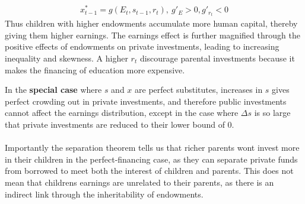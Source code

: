 \documentclass[12pt, a4paper]{article}
\begin{document}
\begin{multicols}{2}
\begin{align*}
x_{t-1}^* = g(E_t, s_{t-1},r_t), \ g'_E>0, g'_{r_t}<0
\end{align*}
Thus children with higher endowments accumulate more human capital, thereby giving them higher earnings. The earnings effect is further magnified through the positive effects of endowments on private investments, leading to increasing inequality and skewness. A higher $r_t$ discourage parental investments because it makes the financing of education more expensive.

In the \textbf{special case} where $s$ and $x$ are perfect substitutes, increases in $s$ gives perfect crowding out in private investments, and therefore public investments cannot affect the earnings distribution, except in the case where $\Delta s$ is so large that private investments are reduced to their lower bound of 0. 
\\ \\
Importantly the separation theorem tells us that richer parents wont invest more in their children in the perfect-financing case, as they can separate private funds from borrowed to meet both the interest of children and parents. This does not mean that childrens earnings are unrelated to their parents, as there is an indirect link through the inheritability of endowments.


\end{multicols}
\end{document}
